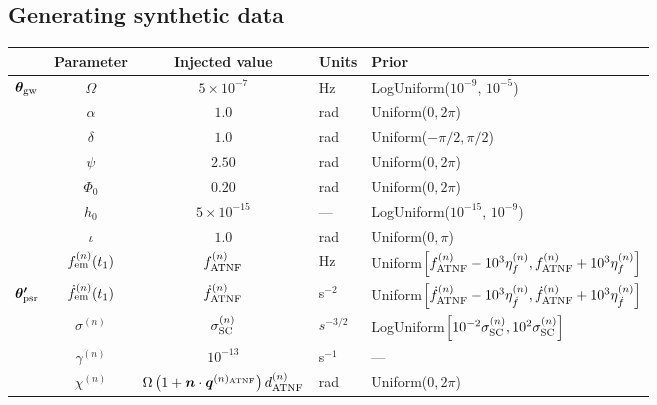 \documentclass[fleqn,usenatbib,useAMS]{mnras}
\begin{document}
\subsection{Generating synthetic data}\label{sec:synthetic_data}
\begin{table}
	\centering
		\begin{tabular}{lccll}
			\toprule
			&Parameter & Injected value & Units & Prior  \\
			\hline
			\multirow{7}{2mm}{$\boldsymbol{\theta}_{\rm gw}$} & $\Omega$       & $5 \times 10^{-7}$ & Hz & LogUniform($10^{-9}$, $10^{-5}$) \\
			& $\alpha$          & $1.0$  & rad & Uniform($0, 2 \pi $)\\
			& $\delta$              & $1.0$  & rad & Uniform($-\pi/2, \pi/2$) \\
			& $\psi$              & $2.50$ & rad & Uniform($0, 2 \pi $) \\
			& $\Phi_0$          & $0.20$ & rad & Uniform($0, 2 \pi $) \\
			& $h_0$            & $5 \times 10^{-15}$ & --- & LogUniform($10^{-15}$, $10^{-9}$) \\
			& $\iota$             & $1.0$ & rad & Uniform($0, \pi$) \\ 
			\hline
			\vspace{1mm}& $f_{\rm em}^{(n)} (t_1)$       & $f_{\rm ATNF}^{(n)}$ & Hz & Uniform$\left[f_{\rm ATNF}^{(n)} - 10^3 \eta^{(n)}_{f}, f_{\rm ATNF}^{(n)} + 10^3 \eta^{(n)}_{f} \right]$ \\
      \multirow{2}{2mm}{$\boldsymbol{\theta'}_{\rm psr}$} & $\dot{f}_{\rm em}^{(n)} (t_1)$       & $\dot{f}_{\rm ATNF}^{(n)}$ & s$^{-2}$ & Uniform$\left[ \dot{f}_{\rm ATNF}^{(n)} - 10^3 \eta^{(n)}_{\dot{f}}, \dot{f}_{\rm ATNF}^{(n)} + 10^3 \eta^{(n)}_{\dot{f}} \right]$ \\
		     & $\sigma^{(n)}$              & $\sigma_{\rm SC}^{(n)}$ & $s^{-3/2}$ & LogUniform$ \left [10^{-2} \sigma_{\rm SC}^{(n)}, 10^2 \sigma_{\rm SC}^{(n)} \right ]$ \\
			& $\gamma^{(n)}$              & $10^{-13}$ & s$^{-1}$ & --- \\
			\hline
			\vspace{1mm} &  $\chi^{(n)}$       &$\Omega \left( 1 + \boldsymbol{n}\cdot \boldsymbol{q}^{(n)_{\rm ATNF}} \right)  d_{\rm ATNF}^{(n)} $  & rad & Uniform($0, 2 \pi $) \\
			\bottomrule
		\end{tabular}

\end{table}
\end{document}
